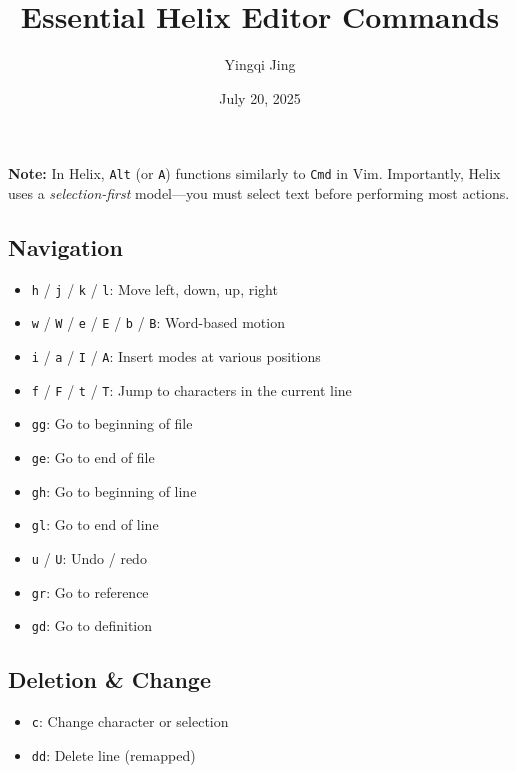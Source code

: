 \documentclass[
  letterpaper,
  DIV=11,
  numbers=noendperiod]{scrartcl}
\title{Essential Helix Editor Commands}
\author{Yingqi Jing}
\date{July 20, 2025}
\providecommand{\tightlist}{%
  \setlength{\itemsep}{0pt}\setlength{\parskip}{0pt}}\usepackage{longtable,booktabs,array}
\renewcommand*\contentsname{Table of contents}
\newcommand\contentsname{Table of contents}
\begin{document}
\maketitle

\renewcommand*\contentsname{Contents}
{
\hypersetup{linkcolor=}
\setcounter{tocdepth}{4}
\tableofcontents
}
\listoffigures
\listoftables

\clearpage

\textbf{Note:} In Helix, \texttt{Alt} (or \texttt{A}) functions
similarly to \texttt{Cmd} in Vim. Importantly, Helix uses a
\emph{selection-first} model---you must select text before performing
most actions.

\subsection{\texorpdfstring{\textbf{Navigation}}{Navigation}}\label{navigation}

\begin{itemize}
\tightlist
\item
  \texttt{h} / \texttt{j} / \texttt{k} / \texttt{l}: Move left, down,
  up, right
\item
  \texttt{w} / \texttt{W} / \texttt{e} / \texttt{E} / \texttt{b} /
  \texttt{B}: Word-based motion
\item
  \texttt{i} / \texttt{a} / \texttt{I} / \texttt{A}: Insert modes at
  various positions
\item
  \texttt{f} / \texttt{F} / \texttt{t} / \texttt{T}: Jump to characters
  in the current line
\item
  \texttt{gg}: Go to beginning of file
\item
  \texttt{ge}: Go to end of file
\item
  \texttt{gh}: Go to beginning of line
\item
  \texttt{gl}: Go to end of line
\item
  \texttt{u} / \texttt{U}: Undo / redo
\item
  \texttt{gr}: Go to reference
\item
  \texttt{gd}: Go to definition
\end{itemize}

\subsection{\texorpdfstring{\textbf{Deletion \&
Change}}{Deletion \& Change}}\label{deletion-change}

\begin{itemize}
\tightlist
\item
  \texttt{c}: Change character or selection
\item
  \texttt{dd}: Delete line (remapped)
\end{itemize}
\end{document}
